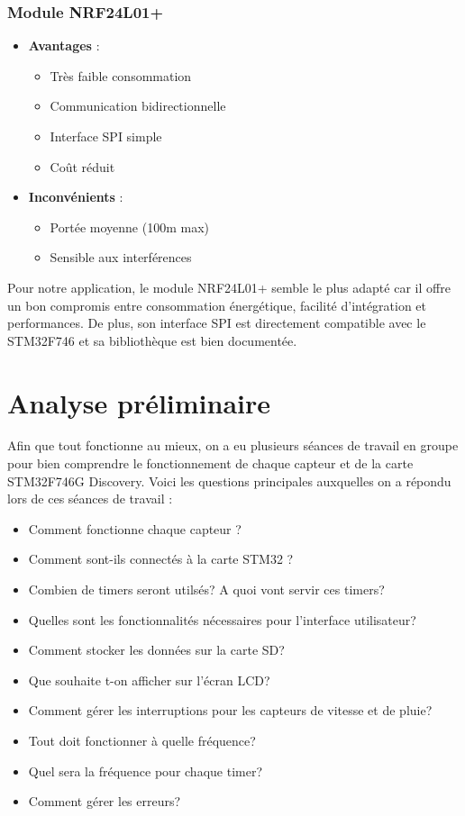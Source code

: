 \documentclass[12pt]{article}
\begin{document}
\subsubsection{Module NRF24L01+}
\begin{itemize}
    \item \textbf{Avantages} :
    \begin{itemize}
        \item Très faible consommation
        \item Communication bidirectionnelle
        \item Interface SPI simple
        \item Coût réduit
    \end{itemize}
    \item \textbf{Inconvénients} :
    \begin{itemize}
        \item Portée moyenne (100m max)
        \item Sensible aux interférences
    \end{itemize}
\end{itemize}

Pour notre application, le module NRF24L01+ semble le plus adapté car il offre un bon compromis entre consommation énergétique, facilité d'intégration et performances. De plus, son interface SPI est directement compatible avec le STM32F746 et sa bibliothèque est bien documentée.

\section{Analyse préliminaire}
Afin que tout fonctionne au mieux, on a eu plusieurs séances de travail en groupe pour bien comprendre le fonctionnement de chaque capteur et de la carte STM32F746G Discovery.
Voici les questions principales auxquelles on a répondu lors de ces séances de travail :
\begin{itemize}
    \item Comment fonctionne chaque capteur ?
    \item Comment sont-ils connectés à la carte STM32 ?
    \item Combien de timers seront utilsés? A quoi vont servir ces timers?
    \item Quelles sont les fonctionnalités nécessaires pour l'interface utilisateur?
    \item Comment stocker les données sur la carte SD?
    \item Que souhaite t-on afficher sur l'écran LCD?
    \item Comment gérer les interruptions pour les capteurs de vitesse et de pluie?
    \item Tout doit fonctionner à quelle fréquence?
    \item Quel sera la fréquence pour chaque timer?
    \item Comment gérer les erreurs?
\end{itemize}
\end{document}
